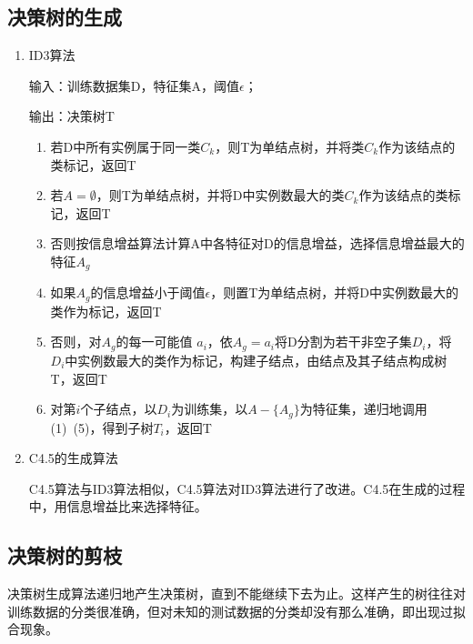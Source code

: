 \subsection*{决策树的生成}
\begin{enumerate}
	\item ID3算法
	
	输入：训练数据集D，特征集A，阈值$\epsilon$；
	
	输出：决策树T
	\begin{enumerate}[(1)]
		\item 若D中所有实例属于同一类$C_k$，则T为单结点树，并将类$C_k$作为该结点的类标记，返回T
		\item 若$A=\emptyset $，则T为单结点树，并将D中实例数最大的类$C_k$作为该结点的类标记，返回T
		\item 否则按信息增益算法计算A中各特征对D的信息增益，选择信息增益最大的特征$A_g$
		\item 如果$A_g$的信息增益小于阈值$\epsilon$，则置T为单结点树，并将D中实例数最大的类作为标记，返回T
		\item 否则，对$A_g$的每一可能值 $a_i$，依$A_g=a_i$将D分割为若干非空子集$D_i$，将$D_i$中实例数最大的类作为标记，构建子结点，由结点及其子结点构成树T，返回T
		\item 对第$i$个子结点，以$D_i$为训练集，以$A-\{A_g\}$为特征集，递归地调用(1)~(5)，得到子树$T_i$，返回T
	\end{enumerate}
	\item C4.5的生成算法
	
	C4.5算法与ID3算法相似，C4.5算法对ID3算法进行了改进。C4.5在生成的过程中，用信息增益比来选择特征。
\end{enumerate}
\subsection*{决策树的剪枝}
决策树生成算法递归地产生决策树，直到不能继续下去为止。这样产生的树往往对训练数据的分类很准确，但对未知的测试数据的分类却没有那么准确，即出现过拟合现象。
